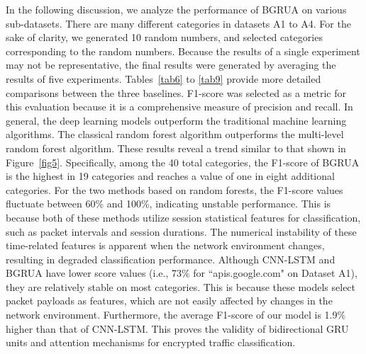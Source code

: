 \documentclass[preprint,12pt]{elsarticle}
\begin{document}
In the following discussion, we analyze the performance of BGRUA on various sub-datasets. There are many different categories in datasets A1 to A4. For the sake of clarity, we generated 10 random numbers, and selected categories corresponding to the random numbers. Because the results of a single experiment may not be representative, the final results were generated by averaging the results of five experiments. Tables~\ref{tab6} to \ref{tab9} provide more detailed comparisons between the three baselines. F1-score was selected as a metric for this evaluation because it is a comprehensive measure of precision and recall. In general, the deep learning models outperform the traditional machine learning algorithms. The classical random forest algorithm outperforms the multi-level random forest algorithm. These results reveal a trend similar to that shown in Figure~\ref{fig5}. Specifically, among the 40 total categories, the F1-score of BGRUA is the highest in 19 categories and reaches a value of one in eight additional categories. For the two methods based on random forests, the F1-score values fluctuate between 60\% and 100\%, indicating unstable performance. This is because both of these methods utilize session statistical features for classification, such as packet intervals and session durations. The numerical instability of these time-related features is apparent when the network environment changes, resulting in degraded classification performance. Although CNN-LSTM and BGRUA have lower score values (i.e., 73\% for ``apis.google.com" on Dataset A1), they are relatively stable on most categories. This is because these models select packet payloads as features, which are not easily affected by changes in the network environment. Furthermore, the average F1-score of our model is 1.9\% higher than that of CNN-LSTM. This proves the validity of bidirectional GRU units and attention mechanisms for encrypted traffic classification.
\end{document}
